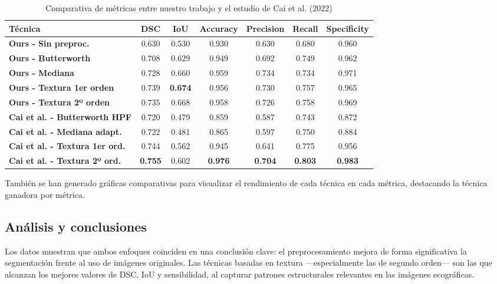 \documentclass[12pt]{article}
\begin{document}
\begin{table}[H]
\centering
\caption{Comparativa de métricas entre nuestro trabajo y el estudio de Cai et al. (2022)}
\label{tab:comparacion_estudio}
\begin{tabular}{|l|c|c|c|c|c|c|}
\hline
\textbf{Técnica} & \textbf{DSC} & \textbf{IoU} & \textbf{Accuracy} & \textbf{Precision} & \textbf{Recall} & \textbf{Specificity} \\
\hline
\textbf{Ours - Sin preproc.}       & 0.630  & 0.530  & 0.930  & 0.630  & 0.680  & 0.960 \\
\textbf{Ours - Butterworth}        & 0.708  & 0.629  & 0.949  & 0.692  & 0.749  & 0.962 \\
\textbf{Ours - Mediana}            & 0.728  & 0.660  & 0.959  & 0.734  & 0.734  & 0.971 \\
\textbf{Ours - Textura 1er orden}  & 0.739  & \textbf{0.674}  & 0.956  & 0.730  & 0.757  & 0.965 \\
\textbf{Ours - Textura 2º orden}   & 0.735  & 0.668  & 0.958  & 0.726  & 0.758  & 0.969 \\
\hline
\textbf{Cai et al. - Butterworth HPF} & 0.720  & 0.479  & 0.859  & 0.587  & 0.743  & 0.872 \\
\textbf{Cai et al. - Mediana adapt.}  & 0.722  & 0.481  & 0.865  & 0.597  & 0.750  & 0.884 \\
\textbf{Cai et al. - Textura 1er ord.}& 0.744  & 0.562  & 0.945  & 0.641  & 0.775  & 0.956 \\
\textbf{Cai et al. - Textura 2º ord.} & \textbf{0.755}  & 0.602  & \textbf{0.976}  & \textbf{0.704}  & \textbf{0.803}  & \textbf{0.983} \\
\hline
\end{tabular}
\end{table}

También se han generado gráficas comparativas para visualizar el rendimiento de cada técnica en cada métrica, destacando la técnica ganadora por métrica.

\subsection{Análisis y conclusiones}

Los datos muestran que ambos enfoques coinciden en una conclusión clave: el preprocesamiento mejora de forma significativa la segmentación frente al uso de imágenes originales. Las técnicas basadas en textura —especialmente las de segundo orden— son las que alcanzan los mejores valores de DSC, IoU y sensibilidad, al capturar patrones estructurales relevantes en las imágenes ecográficas.
\end{document}
